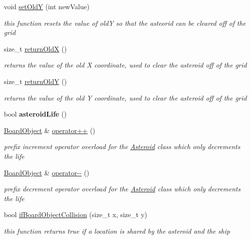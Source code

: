 \begin{DoxyCompactItemize}
void \hyperlink{class_board_object_a9a0df06ac05cfd8d8aa0b0f6b3ba278c}{set\+Old\+Y} (int new\+Value)
\begin{DoxyCompactList}\small\item\em this function resets the value of old\+Y so that the asteorid can be cleared off of the grid \end{DoxyCompactList}\item 
size\+\_\+t \hyperlink{class_board_object_aabf556d1399fa0ebf01eb49b0a634c42}{return\+Old\+X} ()
\begin{DoxyCompactList}\small\item\em returns the value of the old X coordinate, used to clear the asteroid off of the grid \end{DoxyCompactList}\item 
size\+\_\+t \hyperlink{class_board_object_ae7923fde621bf39e5084ee9b3040ab60}{return\+Old\+Y} ()
\begin{DoxyCompactList}\small\item\em returns the value of the old Y coordinate, used to clear the asteroid off of the grid \end{DoxyCompactList}\item 
\hypertarget{class_board_object_abbe110ba81635b721607a1d294b0b20b}{}bool {\bfseries asteroid\+Life} ()\label{class_board_object_abbe110ba81635b721607a1d294b0b20b}

\item 
\hyperlink{class_board_object}{Board\+Object} \& \hyperlink{class_board_object_ac8779fbe0b81be22331d2c42c37fac12}{operator++} ()
\begin{DoxyCompactList}\small\item\em prefix increment operator overload for the \hyperlink{class_asteroid}{Asteroid} class which only decrements the life \end{DoxyCompactList}\item 
\hyperlink{class_board_object}{Board\+Object} \& \hyperlink{class_board_object_af001e15eacc70ec4b628a371a2bf4b61}{operator-\/-\/} ()
\begin{DoxyCompactList}\small\item\em prefix decrement operator overload for the \hyperlink{class_asteroid}{Asteroid} class which only decrements the life \end{DoxyCompactList}\item 
bool \hyperlink{class_board_object_a2831a4f0540a2e7d81f9ace1a44b4d09}{if\+Board\+Object\+Collision} (size\+\_\+t x, size\+\_\+t y)
\begin{DoxyCompactList}\small\item\em this function returns true if a location is shared by the asteroid and the ship \end{DoxyCompactList}\end{DoxyCompactItemize}


